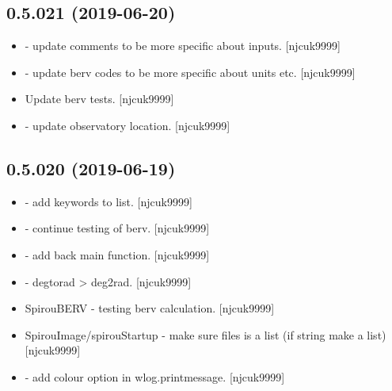 \documentclass[a4paper,10pt,english]{report}
\begin{document}
\subsection{0.5.021 (2019-06-20)}
\label{\detokenize{misc/changelog:id116}}\begin{itemize}
\item {} 
 - update comments to be more specific about inputs.
{[}njcuk9999{]}

\item {} 
 - update berv codes to be more specific about units etc.
{[}njcuk9999{]}

\item {} 
Update berv tests. {[}njcuk9999{]}

\item {} 
 - update observatory location. {[}njcuk9999{]}

\end{itemize}


\subsection{0.5.020 (2019-06-19)}
\label{\detokenize{misc/changelog:id117}}\begin{itemize}
\item {} 
 - add keywords to list. {[}njcuk9999{]}

\item {} 
 - continue testing of berv. {[}njcuk9999{]}

\item {} 
 - add back main function. {[}njcuk9999{]}

\item {} 
 - degtorad \textendash{}\textgreater{} deg2rad. {[}njcuk9999{]}

\item {} 
SpirouBERV - testing berv calculation. {[}njcuk9999{]}

\item {} 
SpirouImage/spirouStartup - make sure files is a list (if string make
a list) {[}njcuk9999{]}

\item {} 
 - add colour option in wlog.printmessage. {[}njcuk9999{]}

\end{itemize}
\end{document}
